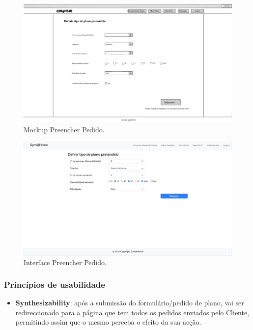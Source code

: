 \begin{figure}[H]
    \centering
    \includegraphics[scale=0.25]{images/mockups/cliente_formulrio.png}
    \caption{Mockup Preencher Pedido.}
    \label{fig:mockuppreencherpedido}
\end{figure}

\begin{figure}[H]
    \centering
    \includegraphics[scale=0.25]{images/interfaces/client_formulario.png}
    \caption{Interface Preencher Pedido.}
    \label{fig:interfacepreencherpedido}
\end{figure}

\subsubsection{Princípios de usabilidade}
\begin{itemize}
    \item \textbf{Synthesizability}: após a submissão do formulário/pedido de plano, vai ser redireccionado para a página que tem todos os pedidos enviados pelo Cliente, permitindo assim que o mesmo perceba o efeito da sua acção.
\end{itemize}

